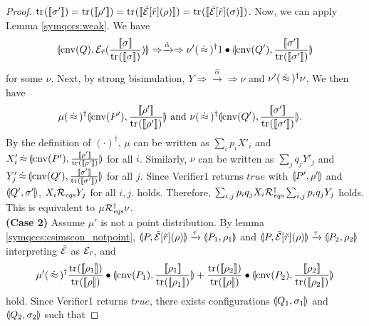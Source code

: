 \begin{proof}
 $\tr{}{\braw{\sigma'}} = \tr{}{\braw{\rho'}} = 
\tr{}{\braw{\op{\bar \E}{\tilde r}(\rho)}} = \tr{}{\braw{\bar \E[\tilde
 r](\sigma)}}$. Now, we can apply Lemma \ref{symqccs:weak}.
 We have 
\[
 \con{\cnv{Q}}{\E_{\tilde r}
               (\frac{\braw{\sigma}}{\tr{}{\braw{\sigma}}})} 
 \Rightarrow
 \xrightarrow{\hat \alpha} 
 \Rightarrow 
 \nu'
 (\strg)^\dagger
 1 \bullet
 \con{\cnv{Q'}}{\frac{\braw{\sigma'}}{\tr{}{\braw{\sigma'}}}}
\]
 for some $\nu$.
 Next, by strong bisimulation,
 $Y 
  \Rightarrow 
  \xrightarrow{\hat \alpha} 
  \Rightarrow 
  \nu
 $ and
 $\nu' (\,\dot\approx\,)^\dagger \nu$.
 We then have
\begin{align*}
&\mu 
 (\strg)^\dagger 
 \con{\cnv{P'}}{\frac{\braw{\rho'}}{\tr{}{\braw{\rho'}}}}
 \mbox{  and  }
\nu 
 (\strg)^\dagger 
 \con{\cnv{Q'}}{\frac{\braw{\sigma'}}{\tr{}{\braw{\sigma'}}}}.
\end{align*}
By the definition of $(\cdot)^\dagger$, $\mu$ can be
written as $\sum_i p_i X'_i$ and
$X'_i \,\dot\approx\,  \llparenthesis \mathrm{cnv}(P'), \frac{[\![\rho']\!]}{{\rm tr}_{}([\![\rho']\!])} \rrparenthesis$
for all $i$.
Similarly, $\nu$ can be written as $\sum_j q_j Y'_j$ and
$Y'_j \,\dot\approx\,  \llparenthesis \mathrm{cnv}(Q'), \frac{[\![\sigma']\!]}{{\rm tr}_{}([\![\sigma']\!])} \rrparenthesis$
for all $j$.
Since Verifier1 returns $\mathit{true}$ with $\llparenthesis P', \rho' \rrparenthesis$ and 
$\llparenthesis Q', \sigma' \rrparenthesis$, $X_i \mathcal{R}_{\mathit{eqs}} Y_j$ for all $i, j$.
 holds. Therefore, $\sum_{i,j} p_i q_j X_i \mathcal{R}_{\mathit{eqs}}^\dagger
 \sum_{i,j} p_i q_j Y_j$ holds. This is equivalent to
 $\mu \mathcal{R}_{\mathit{eqs}}^\dagger \nu$.
 \\
{\bf (Case 2)}
 Assume $\mu'$ is not a point distribution. 
 By lemma \ref{symqccs:csimscon_notpoint},
 $\llparenthesis P, \bar {\mathcal{E}}[\tilde r](\rho) \rrparenthesis 
  \xrightarrow{\tau}
  \llparenthesis P_1, \rho_1 \rrparenthesis$ and
 $\llparenthesis P, \bar {\mathcal{E}}[\tilde r](\rho) \rrparenthesis
  \xrightarrow{\tau}
  \llparenthesis P_2, \rho_2 \rrparenthesis$ interpreting $\bar {\mathcal{E}}$ as
 $\mathcal{E}_{\tilde r}$, and
\[
 \mu' (\strg)^\dagger 
 \frac{\tr{}{\braw{\rho_1}}}{\tr{}{\braw{\rho}}}
 \bullet 
 \con{\cnv{P_1}}
 {\frac{\braw{\rho_1}}{\tr{}{\braw{\rho_1}}}} + 
 \frac{\tr{}{\braw{\rho_2}}}{\tr{}{\braw{\rho}}}
 \bullet 
 \con{\cnv{P_2}}
 {\frac{\braw{\rho_2}}{\tr{}{\braw{\rho_2}}}}
\]
hold.
 Since Verifier1 returns $\mathit{true}$, there exists 
 configurations $\llparenthesis Q_1, \sigma_1 \rrparenthesis$ and $\llparenthesis Q_2, \sigma_2 \rrparenthesis$ 
 such that
\end{proof}
